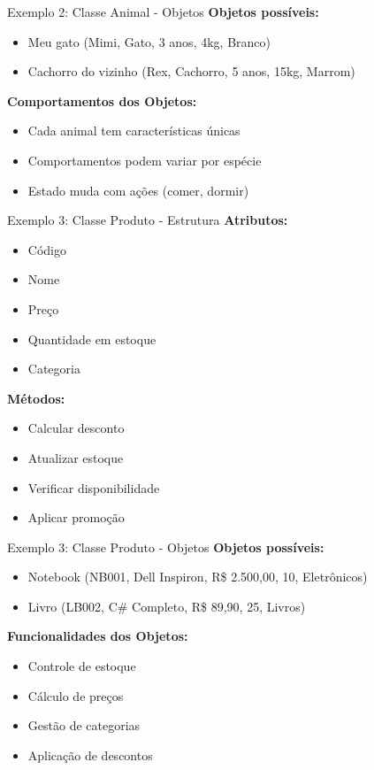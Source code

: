 \documentclass[aspectratio=169]{beamer}
\begin{document}
\begin{frame}{Exemplo 2: Classe Animal - Objetos}
\textbf{Objetos possíveis:}
\begin{itemize}
\item Meu gato (Mimi, Gato, 3 anos, 4kg, Branco)
\item Cachorro do vizinho (Rex, Cachorro, 5 anos, 15kg, Marrom)
\end{itemize}

\vspace{0.5cm}
\textbf{Comportamentos dos Objetos:}
\begin{itemize}
\item Cada animal tem características únicas
\item Comportamentos podem variar por espécie
\item Estado muda com ações (comer, dormir)
\end{itemize}
\end{frame}

\begin{frame}{Exemplo 3: Classe Produto - Estrutura}
\textbf{Atributos:}
\begin{itemize}
\item Código
\item Nome
\item Preço
\item Quantidade em estoque
\item Categoria
\end{itemize}

\vspace{0.5cm}
\textbf{Métodos:}
\begin{itemize}
\item Calcular desconto
\item Atualizar estoque
\item Verificar disponibilidade
\item Aplicar promoção
\end{itemize}
\end{frame}

\begin{frame}{Exemplo 3: Classe Produto - Objetos}
\textbf{Objetos possíveis:}
\begin{itemize}
\item Notebook (NB001, Dell Inspiron, R\$ 2.500,00, 10, Eletrônicos)
\item Livro (LB002, C\# Completo, R\$ 89,90, 25, Livros)
\end{itemize}

\vspace{0.5cm}
\textbf{Funcionalidades dos Objetos:}
\begin{itemize}
\item Controle de estoque
\item Cálculo de preços
\item Gestão de categorias
\item Aplicação de descontos
\end{itemize}
\end{frame}
\end{document}
